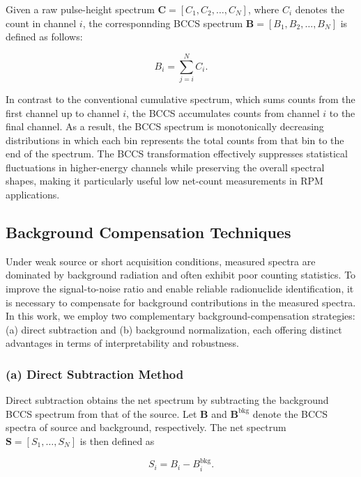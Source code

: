 \documentclass[10pt]{wlscirep}
\begin{document}
Given a raw pulse-height spectrum $\mathbf{C} = [C_1, C_2, \ldots, C_N]$, where $C_i$ denotes the count in channel $i$, the corresponnding BCCS spectrum $\mathbf{B} = [B_1, B_2, \ldots , B_N]$ is defined as follows: 

\begin{equation}
B_i = \sum_{j=i}^N C_i.
\end{equation}

In contrast to the conventional cumulative spectrum, which sums counts from the first channel up to channel $i$, the BCCS accumulates counts from channel $i$ to the final channel. As a result, the BCCS spectrum is monotonically decreasing distributions in which each bin represents the total counts from that bin to the end of the spectrum. The BCCS transformation effectively suppresses statistical fluctuations in higher-energy channels while preserving the overall spectral shapes, making it particularly useful low net-count measurements in RPM applications. 

\subsection*{Background Compensation Techniques}

Under weak source or short acquisition conditions, measured spectra are dominated by background radiation and often exhibit poor counting statistics. To improve the signal-to-noise ratio and enable reliable radionuclide identification, it is necessary to compensate for background contributions in the measured spectra. In this work, we employ two complementary background-compensation strategies: (a) direct subtraction and (b) background normalization, each offering distinct advantages in terms of interpretability and robustness.


\subsubsection*{(a) Direct Subtraction Method}

Direct subtraction obtains the net spectrum by subtracting the background BCCS spectrum from that of the source. Let $\mathbf{B}$ and $\mathbf{B}^\textrm{bkg}$ denote the BCCS spectra of source and background, respectively. The net spectrum $\mathbf{S} = [S_1,\ldots,S_N]$ is then defined as

\begin{equation}
S_i =  B_i - B_i^{\textrm{bkg}}.
\end{equation}
\end{document}
